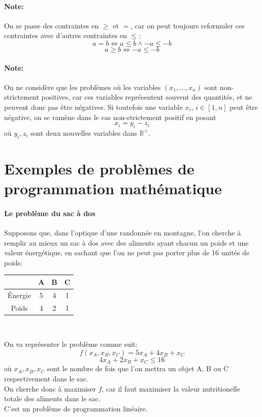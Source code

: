 \documentclass[a4paper]{report}
\begin{document}
\paragraph{Note:}On se passe des contraintes en \(\ge\) et \(=\), car on peut toujours reformuler ces contraintes avec d'autres contraintes en \(\le\):
\[a=b\Leftrightarrow a\le b\land -a\le-b\]
\[a\ge b\Leftrightarrow -a\le-b\]

\paragraph{Note:}On ne considère que les  problèmes où les variables \((x_1,\dots,x_n)\) sont non-strictement positives, car ces variables représentent souvent des quantités, et ne peuvent donc pas être négatives. Si toutefois une variable \(x_i,\,i\in[1,n]\) peut être négative, on se ramène dans le cas non-strictement positif en posant
\[x_i=y_i-z_i\]
où \(y_i,z_i\) sont deux nouvelles variables dans \(\mathbb{R}^+\).

\section{Exemples de problèmes de programmation mathématique}
\paragraph{Le problème du sac à dos} Supposons que, dans l'optique d'une
randonnée en montagne, l'on cherche à remplir au mieux un sac à dos avec des
aliments ayant chacun un poids et une valeur énergétique, en sachant que l'on ne
peut pas porter plus de 16 unités de poids:
\begin{center}
\begin{tabular}{|c|c|c|c|}
\hline
 & A & B & C \\
\hline
Énergie & 5 & 4 & 1 \\
\hline
Poids & 4 & 2 & 1 \\
\hline
\end{tabular}
\\
\end{center}
On va représenter le problème comme suit:
\[f(x_A, x_B, x_C) =5x_A + 4x_B + x_C\]
\[4x_A + 2x_B + x_C \le 16\]
où \(x_A,x_B,x_C\) sont le nombre de fois que l'on mettra un objet A, B ou C
respectivement dans le sac.\\
On cherche donc à maximiser \(f\), car il faut maximiser la valeur nutritionelle
totale des aliments dans le sac.\\
C'est un problème de programmation linéaire.
\end{document}
